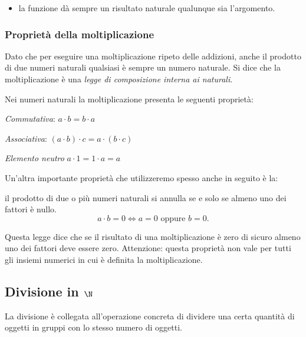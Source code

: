 \vspace{-1em}
\begin{osservazione}
\begin{itemize} [nosep]
\item la funzione dà sempre un risultato naturale qualunque sia l'argomento.
\end{itemize}

\end{osservazione}

\subsubsection{Proprietà della moltiplicazione}

Dato che per eseguire una moltiplicazione ripeto delle addizioni, 
anche il prodotto di due numeri  naturali qualsiasi è sempre un numero 
naturale. 
Si dice che la moltiplicazione è una \emph{legge di composizione interna ai
naturali}. 

Nei numeri naturali la moltiplicazione presenta le seguenti proprietà:

\begin{itemize*}
 \item \emph{Commutativa}: \(a \cdot b = b \cdot a\)
 \item \emph{Associativa}: \((a \cdot b) \cdot c = a \cdot (b \cdot c)\)
 \item \emph{Elemento neutro} \(a \cdot 1 = 1 \cdot a = a\)
\end{itemize*}

Un'altra importante proprietà che utilizzeremo spesso anche in seguito è la:

\begin{legge}
il prodotto di due o più numeri naturali si annulla se e solo se almeno uno 
dei fattori è nullo.
\[ a\cdot b=0\Leftrightarrow a=0\text{ oppure }b=0. \]
\end{legge}

Questa legge dice che se il risultato di una moltiplicazione è zero di 
sicuro almeno uno dei fattori deve essere zero. Attenzione: questa proprietà 
non vale per tutti gli insiemi numerici in cui è definita la 
moltiplicazione.

\subsection{Divisione in \(\N\)}

La divisione è collegata all'operazione concreta di dividere una certa
quantità di oggetti in gruppi con lo stesso numero di oggetti.

